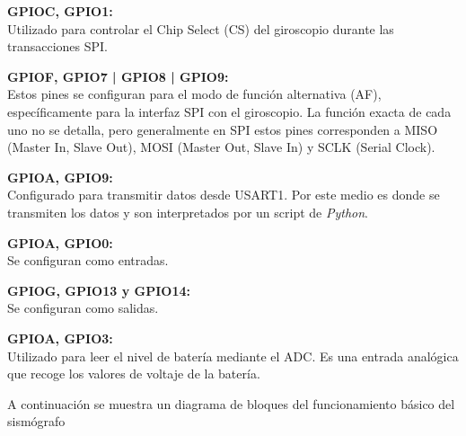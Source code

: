 \textbf{GPIOC, GPIO1:} \\
Utilizado para controlar el Chip Select (CS) del giroscopio durante las transacciones SPI. 

\textbf{GPIOF, GPIO7 | GPIO8 | GPIO9:} \\
Estos pines se configuran para el modo de función alternativa (AF), específicamente para la interfaz SPI con el giroscopio. La función exacta de cada uno no se detalla, pero generalmente en SPI estos pines corresponden a MISO (Master In, Slave Out), MOSI (Master Out, Slave In) y SCLK (Serial Clock).

\textbf{GPIOA, GPIO9:} \\
Configurado para transmitir datos desde USART1. Por este medio es donde se transmiten los datos y son interpretados por un script de \textit{Python}.

\textbf{GPIOA, GPIO0:} \\
Se configuran como entradas. 

\textbf{GPIOG, GPIO13 y GPIO14:} \\
Se configuran como salidas. 

\textbf{GPIOA, GPIO3:} \\
Utilizado para leer el nivel de batería mediante el ADC. Es una entrada analógica que recoge los valores de voltaje de la batería.

A continuación se muestra un diagrama de bloques del funcionamiento básico del sismógrafo

